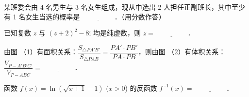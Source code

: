 \begin{question}
某班委会由 4 名男生与 3 名女生组成，现从中选出 2 人担任正副班长，其中至少有 1 名女生当选的概率是 $\underline{\hspace{2cm}}$．（用分数作答）

\end{question}
\begin{question}
已知复数 $z$ 与 $(z + 2)^2 - 8\mathrm{i}$ 均是纯虚数，则 $z = \underline{\hspace{2cm}}$．

\Needspace{0.4\textheight}
\end{question}
\begin{question}
由图 （1）有面积关系：$\dfrac{S_{\triangle PA'B'}}{S_{\triangle PAB}} = \dfrac{PA' \cdot PB'}{PA \cdot PB}$，则由图 （2）有体积关系：$\dfrac{V_{P-A'B'C'}}{V_{P-ABC}} = \underline{\hspace{2cm}}$．
\nopagebreak[4]
\begin{center}\end{center}
\nopagebreak[4]
\end{question}
\begin{question}
函数 $f(x) = \ln(\sqrt{x + 1} - 1)$ ($x > 0$) 的反函数 $f^{-1}(x) = \underline{\hspace{2cm}}$．

\end{question}

